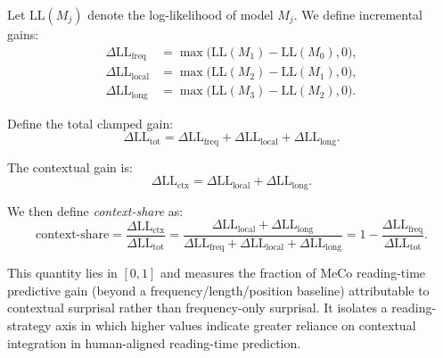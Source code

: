 \documentclass[11pt]{article}
\begin{document}
Let $\mathrm{LL}(M_j)$ denote the log-likelihood of model $M_j$. We define incremental gains:
\begin{align*}
\Delta \mathrm{LL}_{\text{freq}} &= \max\big(\mathrm{LL}(M_1)-\mathrm{LL}(M_0), 0\big), \\
\Delta \mathrm{LL}_{\text{local}} &= \max\big(\mathrm{LL}(M_2)-\mathrm{LL}(M_1), 0\big), \\
\Delta \mathrm{LL}_{\text{long}} &= \max\big(\mathrm{LL}(M_3)-\mathrm{LL}(M_2), 0\big).
\end{align*}

Define the total clamped gain:
\[
\Delta \mathrm{LL}_{\text{tot}} =
\Delta \mathrm{LL}_{\text{freq}} +
\Delta \mathrm{LL}_{\text{local}} +
\Delta \mathrm{LL}_{\text{long}}.
\]

The contextual gain is:
\[
\Delta \mathrm{LL}_{\text{ctx}} =
\Delta \mathrm{LL}_{\text{local}} + \Delta \mathrm{LL}_{\text{long}}.
\]

We then define \textit{context-share} as:
\[
\mathrm{context\text{-}share}
=
\frac{\Delta \mathrm{LL}_{\text{ctx}}}{\Delta \mathrm{LL}_{\text{tot}}}
=
\frac{\Delta \mathrm{LL}_{\text{local}} + \Delta \mathrm{LL}_{\text{long}}}
{\Delta \mathrm{LL}_{\text{freq}} + \Delta \mathrm{LL}_{\text{local}} + \Delta \mathrm{LL}_{\text{long}}}
=
1 - \frac{\Delta \mathrm{LL}_{\text{freq}}}{\Delta \mathrm{LL}_{\text{tot}}}.
\]

This quantity lies in $[0,1]$ and measures the fraction of MeCo reading-time predictive gain (beyond a frequency/length/position baseline) attributable to contextual surprisal rather than frequency-only surprisal. It isolates a reading-strategy axis in which higher values indicate greater reliance on contextual integration in human-aligned reading-time prediction.

\newpage 
\end{document}
